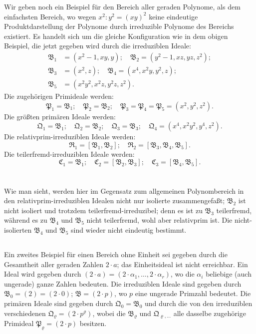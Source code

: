 \documentclass[fontsize=10pt,paper=a5,pagesize,headings=small]{scrbook}
\newcommand{\ideal}[1]{\mathfrak{#1}}
\theoremstyle{plain}
\begin{document}
Wir geben noch ein Beispiel für den Bereich aller geraden Polynome, als
dem einfachsten Bereich, wo wegen $x^2 : y^2 = (xy)^2$ keine eindeutige
Produktdarstellung der Polynome durch irreduzible Polynome des Bereichs
existiert. Es handelt sich um die gleiche Konfiguration wie in dem obigen
Beispiel, die jetzt gegeben wird durch die irreduziblen Ideale:
\begin{align*}
\ideal{B}_1 &= (x^2-1, xy, y);\quad \ideal{B}_2 = (y^2-1, xz, yz, z^2);\\
\ideal{B}_3 &= (x^2, z);\quad \ideal{B}_4 = (x^4, x^2y, y^2, z);\\
\ideal{B}_5 &= (x^2y^2, x^2z, y^2z, z^2).
\end{align*}
Die zugehörigen Primideale werden:
\[ \ideal{P}_1 = \ideal{B}_1;\quad \ideal{P}_2 = \ideal{B}_2;\quad
\ideal{P}_3 = \ideal{P}_4 = \ideal{P}_5 = (x^2, y^2, z^2). \]
Die größten primären Ideale werden:
\[ \ideal{Q}_1 = \ideal{B}_1;\quad \ideal{Q}_2 = \ideal{B}_2;\quad
\ideal{Q}_3 = \ideal{B}_3;\quad \ideal{Q}_4 = (x^4, x^2y^2, y^4, z^2). \]
Die relativprim-irreduziblen Ideale werden:
\[ \ideal{R}_1 = [\ideal{B}_1, \ideal{B}_2];\quad \ideal{R}_2 = [\ideal{B}_3, \ideal{B}_4, \ideal{B}_5]. \]
Die teilerfremd-irreduziblen Ideale werden:
\[ \ideal{C}_1 = \ideal{B}_1;\quad \ideal{C}_2 = [\ideal{B}_2, \ideal{B}_3];
\quad \ideal{C}_3 = [\ideal{B}_4, \ideal{B}_5]. \]

\setcounter{page}{406}
\section*{}

Wie man sieht, werden hier im Gegensatz zum allgemeinen Polynombereich
in den relativprim-irreduziblen Idealen nicht nur isolierte zusammengefaßt;
$\ideal{B}_2$ ist nicht isoliert und trotzdem teilerfremd-irreduzibel; denn es ist zu
$\ideal{B}_3$ teilerfremd, während es zu $\ideal{B}_4$ und $\ideal{B}_5$ nicht teilerfremd, wohl aber relativprim
ist. Die nicht-isolierten $\ideal{B}_4$ und $\ideal{B}_5$ sind wieder nicht eindeutig bestimmt.

\subsection{}

Ein zweites Beispiel für einen Bereich ohne Einheit sei gegeben durch
die Gesamtheit aller geraden Zahlen $2\cdot a$; das Einheitsideal ist nicht
erreichbar. Ein Ideal wird gegeben durch $(2\cdot a) = (2\cdot\alpha_1,\dots,2\cdot\alpha_r)$,
wo die $\alpha_i$ beliebige (auch ungerade) ganze Zahlen bedeuten. Die
irreduziblen Ideale sind gegeben durch $\ideal{B}_0 = (2) = (2\cdot 0)$;
$\ideal{B} = (2\cdot p)$, wo $p$ eine ungerade Primzahl bedeutet. Die primären
Ideale sind gegeben durch $\ideal{Q}_0 = \ideal{B}_0$ und durch die von den
irreduziblen verschiedenen $\ideal{Q}_\varrho = (2\cdot p^\varrho)$, wobei die $\ideal{B}_\varrho$ und
$\ideal{Q}_{\varrho,\dots}$ alle dasselbe zugehörige Primideal $\ideal{P}_\varrho = (2\cdot p)$ besitzen.
\end{document}
